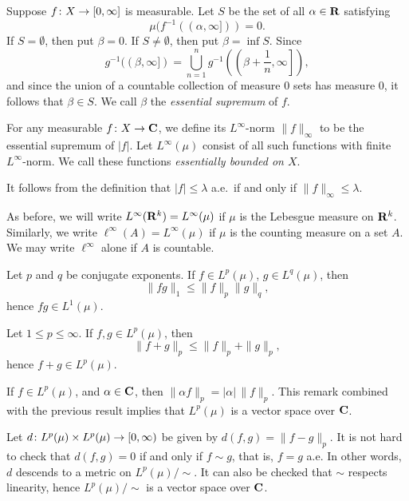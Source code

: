 \begin{definition}
  Suppose $f \colon X \rightarrow [0,\infty]$ is measurable. Let $S$ be the set of all $\alpha \in \mathbf{R}$ satisfying
  \[
  \mu(f^{-1}((\alpha,\infty])) = 0.
  \]
  If $S = \emptyset$, then put $\beta = 0$. If $S \neq \emptyset$, then put $\beta = \inf S$. Since
  \[
  g^{-1}((\beta,\infty]) = \bigcup_{n=1}^n g^{-1}\left(\left(\beta+\frac{1}{n}, \infty \right]\right),
  \]
  and since the union of a countable collection of measure $0$ sets has measure $0$, it follows that $\beta \in S$. We call $\beta$ the \emph{essential supremum} of $f$.

  For any measurable $f \colon X \rightarrow \mathbf{C}$, we define its $L^\infty$-norm $\|f\|_\infty$ to be the essential supremum of $|f|$. Let $L^\infty(\mu)$ consist of all such functions with finite $L^\infty$-norm. We call these functions \emph{essentially bounded on $X$}.
\end{definition}

\begin{remark}
  It follows from the definition that $|f| \leq \lambda$ a.e.\ if and only if $\|f\|_\infty \leq \lambda$.
\end{remark}

\begin{definition}
  As before, we will write $L^\infty(\mathbf{R}^k) = L^\infty(\mu)$ if $\mu$ is the Lebesgue measure on $\mathbf{R}^k$. Similarly, we write $\ell^\infty(A) = L^\infty(\mu)$ if $\mu$ is the counting measure on a set $A$. We may write $\ell^\infty$ alone if $A$ is countable.
\end{definition}

\begin{theorem}
  Let $p$ and $q$ be conjugate exponents. If $f \in L^p(\mu)$, $g \in L^q(\mu)$, then
  \[
  \|f g\|_1 \leq \|f\|_p \|g\|_q,
  \]
  hence $f g \in L^1(\mu)$.
\end{theorem}

\begin{theorem}
  Let $1 \leq p \leq \infty$. If $f, g \in L^p(\mu)$, then
  \[
  \|f+g\|_p \leq \|f\|_p + \|g\|_p,
  \]
  hence $f+g \in L^p(\mu)$.
\end{theorem}

\begin{remark}
  If $f \in L^p(\mu)$, and $\alpha \in \mathbf{C}$, then $\|\alpha f\|_p = |\alpha| \, \|f\|_p$. This remark combined with the previous result implies  that $L^p(\mu)$ is a vector space over $\mathbf{C}$.
\end{remark}

\begin{remark}
  Let $d \colon L^p(\mu) \times L^p(\mu) \rightarrow [0,\infty)$ be given by $d(f,g) = \|f-g\|_p$. It is not hard to check that $d(f,g) = 0$ if and only if $f \sim g$, that is, $f = g$ a.e. In other words, $d$ descends to a metric on $L^p(\mu)/\!\!\sim$. It can also be checked that $\sim$ respects linearity, hence $L^p(\mu)/\!\!\sim$ is a vector space over $\mathbf{C}$.
\end{remark}


